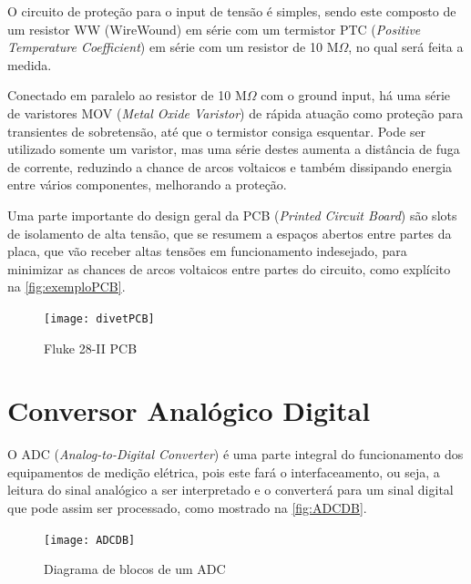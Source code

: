         O circuito de proteção para o input de tensão é simples, sendo este composto de um resistor \gls{WW} (WireWound) em série com um termistor \gls{PTC} (\textit{Positive Temperature Coefficient}) em série com um resistor de 10 M$\Omega$, no qual será feita a medida. 

        Conectado em paralelo ao resistor de 10 M$\Omega$ com o ground input, há uma série de varistores \gls{MOV} (\textit{Metal Oxide Varistor}) de rápida atuação como proteção para transientes de sobretensão, até que o termistor consiga esquentar. Pode ser utilizado somente um varistor, mas uma série destes aumenta a distância de fuga de corrente, reduzindo a chance de arcos voltaicos e também dissipando energia entre vários componentes, melhorando a proteção.

        Uma parte importante do design geral da \gls{PCB} (\textit{Printed Circuit Board}) são slots de isolamento de alta tensão, que se resumem a espaços abertos entre partes da placa, que vão receber altas tensões em funcionamento indesejado, para minimizar as chances de arcos voltaicos entre partes do circuito, como explícito na \autoref{fig:exemploPCB}. %

        \begin{figure}[htb]%
            \caption{Fluke 28-II PCB}%
            \label{fig:exemploPCB}%
            \texttt{[image: divetPCB]}%
        \end{figure}    

\section{Conversor Analógico Digital}\label{sec:ADC}

O \gls{ADC} (\textit{Analog-to-Digital Converter}) é uma parte integral do funcionamento dos equipamentos de medição elétrica, pois este fará o interfaceamento, ou seja, a leitura do sinal analógico a ser interpretado e o converterá para um sinal digital que pode assim ser processado, como mostrado na \autoref{fig:ADCDB}.

\begin{figure}[htb]%
    \caption{Diagrama de blocos de um ADC}%
    \label{fig:ADCDB}%
    \texttt{[image: ADCDB]}%
\end{figure}  

